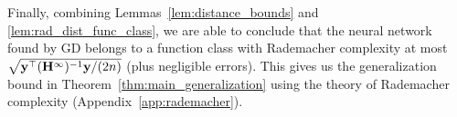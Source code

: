 Finally, combining Lemmas~\ref{lem:distance_bounds} and \ref{lem:rad_dist_func_class}, we are able to conclude that the neural network found by GD belongs to a function class with Rademacher complexity at most $\sqrt{\mathbf{y}^\top (\mathbf{H}^\infty)^{-1} \mathbf{y} /(2n)}$ (plus negligible errors).
This gives us the generalization bound in Theorem~\ref{thm:main_generalization} using the theory of Rademacher complexity (Appendix~\ref{app:rademacher}).













